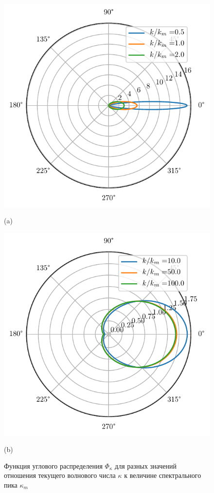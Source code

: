 \begin{figure}[h!]
    \begin{minipage}{0.49\linewidth}
        \centering
        \includegraphics[width=\linewidth]{fig/full_angles1.pdf}

        (a)
    \end{minipage}
    \begin{minipage}{0.49\linewidth}
        \centering
        \includegraphics[width=\linewidth]{fig/full_angles2.pdf}

        (b)
    \end{minipage}
    \caption{Функция углового распределения $\Phi_{\kappa}$ для разных значений
    отношения текущего волнового числа $\kappa$ к величине спектрального пика
$\kappa_m$}
    \label{fig:angles_distrib}
\end{figure}


